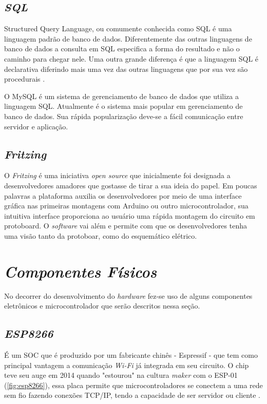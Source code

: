 \subsection[\textit{SQL}]{\textit{SQL}}\label{sql}
Structured Query Language, ou comumente conhecida como SQL é uma linguagem padrão de banco de dados. 
Diferentemente das outras linguagens de banco de dados a consulta em SQL especifica a forma do resultado e não o caminho para chegar nele. Uma outra
grande diferença é que a linguagem SQL é declarativa diferindo mais uma vez das outras linguagens que por sua vez são procedurais \cite{ref-sqlhisto}.

O MySQL é um sistema de gerenciamento de banco de dados que utiliza a linguagem SQL. Atualmente é o sistema mais popular em gerenciamento de 
banco de dados. Sua rápida popularização deve-se a fácil comunicação entre servidor e aplicação.

\subsection[\textit{Fritzing}]{\textit{Fritzing}}\label{fritzing}
O \textit{Fritzing} é uma iniciativa \textit{open source} que inicialmente foi
designada a desenvolvedores amadores que gostasse de tirar a sua ideia do papel. Em poucas palavras
a plataforma auxilia os desenvolvedores por meio de uma interface gráfica nas primeiras montagens com Arduino
ou outro microcontrolador, sua intuitiva interface proporciona ao usuário uma rápida montagem do circuito em protoboard. O \textit{software} vai além
e permite com que os desenvolvedores tenha uma visão tanto da protoboar, como do esquemático elétrico. 


\section[\textit{Componentes Físicos}]{\textit{Componentes Físicos}}\label{comp-fisico}
No decorrer do desenvolvimento do \textit{hardware} fez-se uso de alguns componentes eletrônicos e microcontrolador que serão descritos nessa seção.
\subsection[\textit{ESP8266}]{\textit{ESP8266}}\label{esp}
É um SOC que é produzido por um fabricante chinês - Espressif - que tem como principal vantagem a comunicação \textit{Wi-Fi} já integrada em seu circuito.
O chip teve seu auge em 2014 quando "estourou" na cultura \textit{maker} com o ESP-01 (\autoref{fig:esp8266}), essa placa permite que microcontroladores se conectem a uma rede
sem fio  fazendo conexões TCP/IP, tendo a capacidade de ser servidor ou cliente \cite{ref-esp8266h}.

